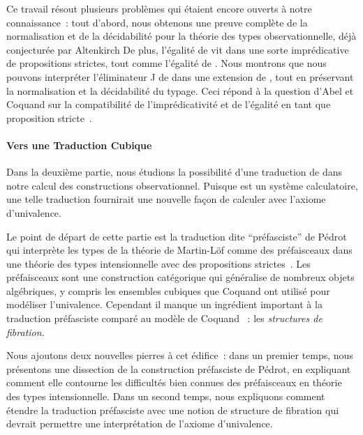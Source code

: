 Ce travail résout plusieurs problèmes qui étaient encore ouverts à notre 
connaissance~: tout d'abord, nous obtenons une preuve complète de la 
normalisation et de la décidabilité pour la théorie des types observationnelle, 
déjà conjecturée par Altenkirch \etal
% 
De plus, l'égalité de \SetoidCC vit dans une sorte imprédicative de propositions 
strictes, tout comme l'égalité de \Lean. 
% 
Nous montrons que nous pouvons interpréter l'éliminateur J de \Lean dans une 
extension de \SetoidCC, tout en préservant la normalisation et la décidabilité 
du typage. 
% 
Ceci répond à la question d'Abel et Coquand sur la compatibilité de 
l'imprédicativité et de l'égalité en tant que proposition stricte~.

\paragraph{Vers une Traduction Cubique}
% 
Dans la deuxième partie, nous étudions la possibilité d'une traduction de 
\HoTT dans notre calcul des constructions observationnel. 
% 
Puisque \SetoidCC est un système calculatoire, une telle traduction fournirait 
une nouvelle façon de calculer avec l'axiome d'univalence. 

Le point de départ de cette partie est la traduction dite ``préfasciste'' 
de Pédrot qui interprète les types de la théorie de Martin-Löf comme des
préfaisceaux dans une théorie des types intensionnelle avec des propositions 
strictes~. 
% 
Les préfaisceaux sont une construction catégorique qui généralise de nombreux 
objets algébriques, y compris les ensembles cubiques que Coquand \etal ont 
utilisé pour modéliser l'univalence. 
% 
Cependant il manque un ingrédient important à la traduction préfasciste
comparé au modèle de Coquand \etal~: les \emph{structures de fibration}.

Nous ajoutons deux nouvelles pierres à cet édifice~: dans un premier temps, 
nous présentons une dissection de la construction préfasciste de Pédrot, 
en expliquant comment elle contourne les difficultés bien connues des 
préfaisceaux en théorie des types intensionnelle.
% 
Dans un second temps, nous expliquons comment étendre la traduction préfasciste 
avec une notion de structure de fibration qui devrait permettre une interprétation 
de l'axiome d'univalence.

